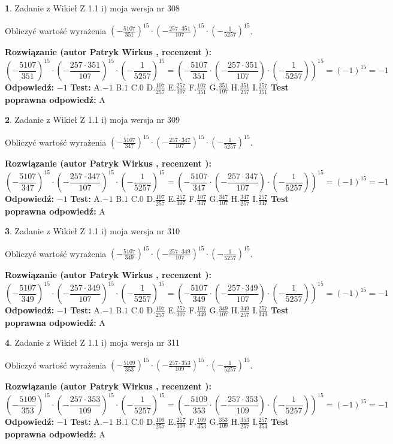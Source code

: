 \documentclass[12pt, a4paper]{article}
\theoremstyle{definition} %
\newtheorem{zad}{}
\newcommand{\zadStart}[1]{\begin{zad}#1\newline}
\newcommand{\zadStop}{\end{zad}}
\newcommand{\rozwStart}[2]{\noindent \textbf{Rozwiązanie (autor #1 , recenzent #2): }\newline}
\newcommand{\rozwStop}{\newline}
\newcommand{\odpStart}{\noindent \textbf{Odpowiedź:}\newline}
\newcommand{\odpStop}{\newline}
\newcommand{\testStart}{\noindent \textbf{Test:}\newline}
\newcommand{\testStop}{\newline}
\newcommand{\kluczStart}{\noindent \textbf{Test poprawna odpowiedź:}\newline}
\newcommand{\kluczStop}{\newline}
\begin{document}
\zadStart{Zadanie z Wikieł Z 1.1 i) moja wersja nr 308}

Obliczyć wartość wyrażenia $(-\frac{5107}{351})^{15} \cdot (-\frac{257 \cdot 351}{107})^{15} \cdot (-\frac{1}{5257})^{15}$.
\zadStop
\rozwStart{Patryk Wirkus}{}
$$(-\frac{5107}{351})^{15} \cdot (-\frac{257 \cdot 351}{107})^{15} \cdot (-\frac{1}{5257})^{15} = (-\frac{5107}{351} \cdot (-\frac{257 \cdot 351}{107}) \cdot (-\frac{1}{5257}))^{15} = (-1)^{15} = -1$$
\rozwStop
\odpStart
$-1$
\odpStop
\testStart
A.$-1$ B.$1$ C.$0$ D.$\frac{107}{257}$ E.$\frac{257}{107}$
F.$\frac{107}{351}$ G.$\frac{351}{107}$
H.$\frac{351}{257}$
I.$\frac{257}{351}$
\testStop
\kluczStart
A
\kluczStop



\zadStart{Zadanie z Wikieł Z 1.1 i) moja wersja nr 309}

Obliczyć wartość wyrażenia $(-\frac{5107}{347})^{15} \cdot (-\frac{257 \cdot 347}{107})^{15} \cdot (-\frac{1}{5257})^{15}$.
\zadStop
\rozwStart{Patryk Wirkus}{}
$$(-\frac{5107}{347})^{15} \cdot (-\frac{257 \cdot 347}{107})^{15} \cdot (-\frac{1}{5257})^{15} = (-\frac{5107}{347} \cdot (-\frac{257 \cdot 347}{107}) \cdot (-\frac{1}{5257}))^{15} = (-1)^{15} = -1$$
\rozwStop
\odpStart
$-1$
\odpStop
\testStart
A.$-1$ B.$1$ C.$0$ D.$\frac{107}{257}$ E.$\frac{257}{107}$
F.$\frac{107}{347}$ G.$\frac{347}{107}$
H.$\frac{347}{257}$
I.$\frac{257}{347}$
\testStop
\kluczStart
A
\kluczStop



\zadStart{Zadanie z Wikieł Z 1.1 i) moja wersja nr 310}

Obliczyć wartość wyrażenia $(-\frac{5107}{349})^{15} \cdot (-\frac{257 \cdot 349}{107})^{15} \cdot (-\frac{1}{5257})^{15}$.
\zadStop
\rozwStart{Patryk Wirkus}{}
$$(-\frac{5107}{349})^{15} \cdot (-\frac{257 \cdot 349}{107})^{15} \cdot (-\frac{1}{5257})^{15} = (-\frac{5107}{349} \cdot (-\frac{257 \cdot 349}{107}) \cdot (-\frac{1}{5257}))^{15} = (-1)^{15} = -1$$
\rozwStop
\odpStart
$-1$
\odpStop
\testStart
A.$-1$ B.$1$ C.$0$ D.$\frac{107}{257}$ E.$\frac{257}{107}$
F.$\frac{107}{349}$ G.$\frac{349}{107}$
H.$\frac{349}{257}$
I.$\frac{257}{349}$
\testStop
\kluczStart
A
\kluczStop



\zadStart{Zadanie z Wikieł Z 1.1 i) moja wersja nr 311}

Obliczyć wartość wyrażenia $(-\frac{5109}{353})^{15} \cdot (-\frac{257 \cdot 353}{109})^{15} \cdot (-\frac{1}{5257})^{15}$.
\zadStop
\rozwStart{Patryk Wirkus}{}
$$(-\frac{5109}{353})^{15} \cdot (-\frac{257 \cdot 353}{109})^{15} \cdot (-\frac{1}{5257})^{15} = (-\frac{5109}{353} \cdot (-\frac{257 \cdot 353}{109}) \cdot (-\frac{1}{5257}))^{15} = (-1)^{15} = -1$$
\rozwStop
\odpStart
$-1$
\odpStop
\testStart
A.$-1$ B.$1$ C.$0$ D.$\frac{109}{257}$ E.$\frac{257}{109}$
F.$\frac{109}{353}$ G.$\frac{353}{109}$
H.$\frac{353}{257}$
I.$\frac{257}{353}$
\testStop
\kluczStart
A
\kluczStop
\end{document}
